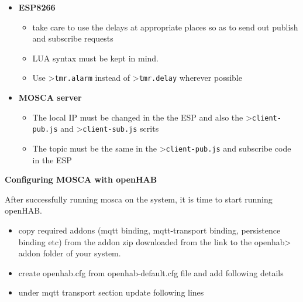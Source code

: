 \documentclass[16pt]{article}
\begin{document}
\begin{itemize}
\item{\textbf{ESP8266}}

\begin{itemize}

\item
  take care to use the delays at appropriate places so as to send out
  publish and subscribe requests
\item
  LUA syntax must be kept in mind.
\item
  Use \textgreater{}\texttt{tmr.alarm} instead of
  \textgreater{}\texttt{tmr.delay} wherever possible
\end{itemize}

\vspace{0.6cm}

\item{\textbf{MOSCA server}}

\begin{itemize}

\item
  The local IP must be changed in the the ESP and also the
  \textgreater{}\texttt{client-pub.js} and
  \textgreater{}\texttt{client-sub.js} scrits
\item
  The topic must be the same in the \textgreater{}\texttt{client-pub.js}
  and subscribe code in the ESP
\end{itemize}

\vspace{0.5cm}
\end{itemize}

{\Large{\textbf{Configuring MOSCA with
openHAB}}}


After successfully running mosca on the system, it is time to start
running openHAB.

\begin{itemize}

\item
  copy required addons (mqtt binding, mqtt-transport binding,
  persistence binding etc) from the addon zip downloaded from the
  link to the openhab\textgreater{} addon folder of your system.
\item
  create openhab.cfg from openhab-default.cfg file and add following
  details
\item
  under mqtt transport section update following lines
\end{itemize}
\end{document}
